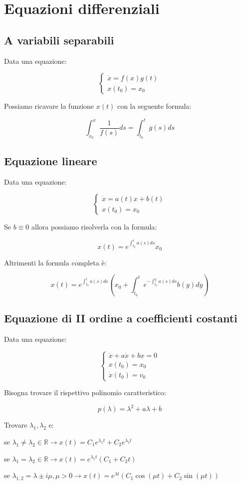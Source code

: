 \documentclass{subfiles}
\begin{document}
\section{Equazioni differenziali}

\subsection{A variabili separabili}

Data una equazione:

$$
\begin{cases}
\dot{x} = f(x)g(t)\\
x(t_0) = x_0
\end{cases}
$$

\noindent
Possiamo ricavare la funzione $x(t)$ con la seguente formula:

$$
\int^{x}_{x_0}\frac{1}{f(s)}ds = \int^{t}_{t_0}g(s)ds
$$

\subsection{Equazione lineare}

Data una equazione:

$$
\begin{cases}
\dot{x} = a(t)x + b(t)\\
x(t_0) = x_0
\end{cases}
$$

\noindent
Se $b \equiv 0$ allora possiamo risolverla con la formula:

$$
x(t) = e^{\int^{t}_{t_0}a(s)ds}x_0
$$

\noindent
Altrimenti la formula completa è:

$$
x(t) = e^{\int^{t}_{t_0}a(s)ds}(x_0 + \int^{t}_{t_0}e^{-\int^{y}_{t_0}a(s)ds}b(y)dy)
$$

\subsection{Equazione di II ordine a coefficienti costanti}

Data una equazione:

$$
\begin{cases}
\ddot{x} + a\dot{x} + bx = 0\\
x(t_0) = x_0\\
\dot{x}(t_0) = v_0
\end{cases}
$$

\noindent
Bisogna trovare il rispettivo polinomio caratteristico:

$$
p(\lambda) = \lambda^2 + a\lambda + b
$$

\noindent
Trovare $\lambda_1, \lambda_2$ e:

\begin{description}
    \item se $\lambda_1 \neq \lambda_2 \in \mathbb{R} \to x(t) = C_1e^{\lambda_1t} + C_2e^{\lambda_2t}$
    \item se $\lambda_1 = \lambda_2 \in \mathbb{R} \to x(t) = e^{\lambda_1t}(C_1 + C_2t)$
    \item se $\lambda_{1,2} = \lambda \pm i\mu, \mu > 0 \to x(t) = e^{\lambda t}(C_1\cos(\mu t) + C_2\sin(\mu t))$
\end{description}
\end{document}
